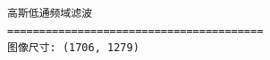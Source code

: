 \documentclass[11pt]{article}
\begin{document}
    \begin{Verbatim}[commandchars=\\\{\}]
高斯低通频域滤波
========================================
图像尺寸: (1706, 1279)
    \end{Verbatim}

    \begin{center}
    \end{center}
    { \hspace*{\fill} \\}
    
    \begin{center}
    \end{center}
    
\end{document}
